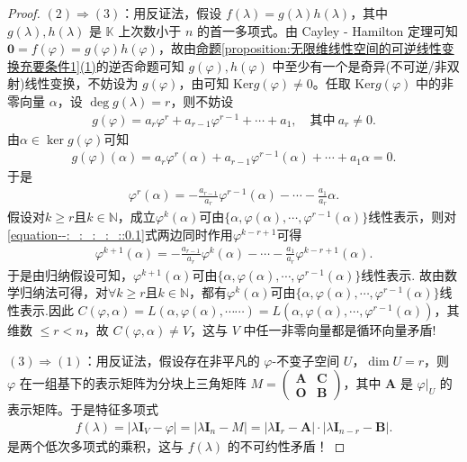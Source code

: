 \documentclass[../../main.tex]{subfiles}
\begin{document}
\begin{proof}
$(2)\Rightarrow(3)$：用反证法，假设 $f(\lambda)=g(\lambda)h(\lambda)$，其中 $g(\lambda),h(\lambda)$ 是 $\mathbb{K}$ 上次数小于 $n$ 的首一多项式。由 Cayley - Hamilton 定理可知 $\mathbf{0}=f(\varphi)=g(\varphi)h(\varphi)$，故由\hyperref[proposition:无限维线性空间的可逆线性变换充要条件1]{命题\ref{proposition:无限维线性空间的可逆线性变换充要条件1}(1)}的逆否命题可知 $g(\varphi),h(\varphi)$ 中至少有一个是奇异(不可逆/非双射)线性变换，不妨设为 $g(\varphi)$，由可知 $\mathrm{Ker}g(\varphi)\neq 0$。任取 $\mathrm{Ker}g(\varphi)$ 中的非零向量 $\alpha$，设 $\deg g(\lambda)=r$，则不妨设
\begin{align*}
g(\varphi) = a_r \varphi^r + a_{r-1} \varphi^{r-1} + \cdots + a_1, \quad \text{其中} \ a_r \neq 0.
\end{align*}
由$\alpha \in \ker g(\varphi)$可知
\begin{align*}
g(\varphi)(\alpha) = a_r \varphi^r(\alpha) + a_{r-1} \varphi^{r-1}(\alpha) + \cdots + a_1 \alpha = 0.
\end{align*}
于是
\begin{align}
\varphi^r(\alpha) = -\frac{a_{r-1}}{a_r} \varphi^{r-1}(\alpha) - \cdots - \frac{a_1}{a_r} \alpha. \label{equation--:_:_:_:_::0.1}
\end{align}
假设对$k \geq r$且$k \in \mathbb{N}$，成立$\varphi^k(\alpha)$可由$\{ \alpha, \varphi(\alpha), \cdots, \varphi^{r-1}(\alpha) \}$线性表示，则对\eqref{equation--:_:_:_:_::0.1}式两边同时作用$\varphi^{k-r+1}$可得
\begin{align*}
\varphi^{k+1}(\alpha) = -\frac{a_{r-1}}{a_r} \varphi^k(\alpha) - \cdots - \frac{a_1}{a_r} \varphi^{k-r+1}(\alpha).
\end{align*}
于是由归纳假设可知，$\varphi^{k+1}(\alpha)$可由$\{ \alpha, \varphi(\alpha), \cdots, \varphi^{r-1}(\alpha) \}$线性表示. 故由数学归纳法可得，对$\forall k \geq r$且$k \in \mathbb{N}$，都有$\varphi^k(\alpha)$可由$\{ \alpha, \varphi(\alpha), \cdots, \varphi^{r-1}(\alpha) \}$线性表示.因此
$C(\varphi ,\alpha )=L(\alpha ,\varphi (\alpha ),\cdots \cdots )=L(\alpha ,\varphi (\alpha ),\cdots ,\varphi ^{r-1}(\alpha ))$，其维数 $\leq r < n$，故 $C(\varphi,\alpha)\neq V$，这与 $V$ 中任一非零向量都是循环向量矛盾!

$(3)\Rightarrow(1)$：用反证法，假设存在非平凡的 $\varphi$-不变子空间 $U$，$\dim U = r$，则 $\varphi$ 在一组基下的表示矩阵为分块上三角矩阵 $M = \begin{pmatrix}
\boldsymbol{A} & \boldsymbol{C} \\
\boldsymbol{O} & \boldsymbol{B}
\end{pmatrix}$，其中 $\boldsymbol{A}$ 是 $\varphi|_U$ 的表示矩阵。于是特征多项式
\begin{align*}
f(\lambda)=|\lambda\boldsymbol{I}_V - \varphi|=|\lambda\boldsymbol{I}_n - M|=|\lambda\boldsymbol{I}_r - \boldsymbol{A}|\cdot|\lambda\boldsymbol{I}_{n - r} - \boldsymbol{B}|.
\end{align*}
是两个低次多项式的乘积，这与 $f(\lambda)$ 的不可约性矛盾！
\end{proof}
\end{document}
